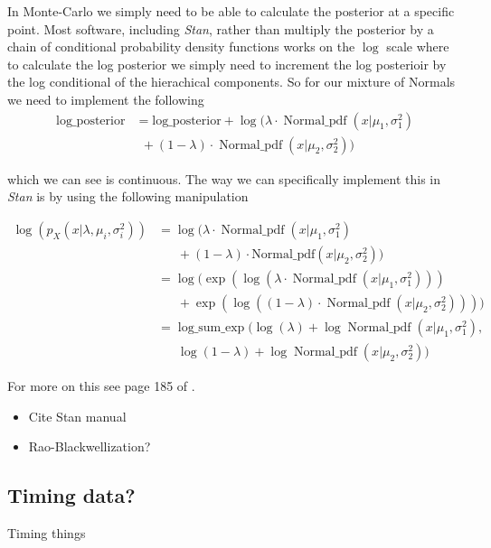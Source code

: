 \documentclass{report}
\begin{document}
In Monte-Carlo we simply need to be able to calculate the posterior at a specific point. Most software, including \emph{Stan}, rather than multiply the posterior by a chain of conditional probability density functions works on the $\log$ scale where to calculate the log posterior we simply need to increment the log posterioir by the log conditional of the hierachical components. So for our mixture of Normals we need to implement the following
\begin{align}
  \text{log\_posterior} &= \text{log\_posterior} + \log(\lambda \cdot \operatorname{Normal\_pdf}(x | \mu_1, \sigma_1^2)  \nonumber \\
                   & \ \ + (1 - \lambda) \cdot \operatorname{Normal\_pdf}(x | \mu_2, \sigma_2^2))
\end{align}

which we can see is continuous. The way we can specifically implement this in \emph{Stan} is by using the following manipulation

\begin{align}
\log(p_X(x | \lambda, \mu_i, \sigma^2_i)) &= \log(\lambda \cdot \operatorname{Normal\_pdf}(x | \mu_1, \sigma_1^2)  \nonumber \\
& \ \ \ \ \ \ \ + (1 - \lambda) \cdot \text{Normal\_pdf}(x | \mu_2, \sigma_2^2)) \\
&= \log(\exp(\log(\lambda \cdot \operatorname{Normal\_pdf}(x | \mu_1, \sigma_1^2)))  \nonumber \\
& \ \ \ \ \ \ \ + \exp(\log((1 - \lambda) \cdot \operatorname{Normal\_pdf}(x | \mu_2, \sigma_2^2)))) \\
&= \operatorname{log\_sum\_exp}(\log(\lambda) + \log\operatorname{Normal\_pdf}(x | \mu_1, \sigma_1^2),  \nonumber \\
& \ \ \ \ \ \ \ \log(1 - \lambda) + \log\operatorname{Normal\_pdf}(x | \mu_2, \sigma_2^2))
\end{align} 

For more on this see page 185 of \cite{stan}.

\begin{itemize}

\item Cite Stan manual

\item Rao-Blackwellization? 

\end{itemize}

\subsection{Timing data?}

Timing things

\printbibliography
\end{document}
